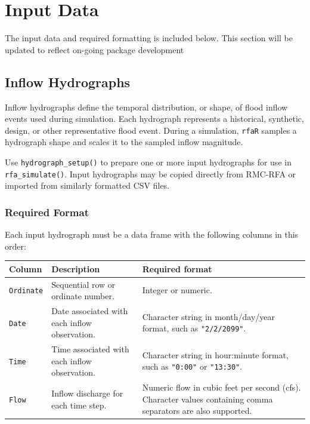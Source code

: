 \documentclass[
  letterpaper,
  DIV=11,
  numbers=noendperiod]{scrreprt}
\newcounter{none} %
\begin{document}
\section{Input Data}\label{input-data}

The input data and required formatting is included below. This section
will be updated to reflect on-going package development

\subsection{Inflow Hydrographs}\label{inflow-hydrographs}

Inflow hydrographs define the temporal distribution, or shape, of flood
inflow events used during simulation. Each hydrograph represents a
historical, synthetic, design, or other representative flood event.
During a simulation, \texttt{rfaR} samples a hydrograph shape and scales
it to the sampled inflow magnitude.

Use \texttt{hydrograph\_setup()} to prepare one or more input
hydrographs for use in \texttt{rfa\_simulate()}. Input hydrographs may
be copied directly from RMC-RFA or imported from similarly formatted CSV
files.

\subsubsection{Required Format}\label{required-format}

Each input hydrograph must be a data frame with the following columns in
this order:

{\def\LTcaptype{none} %
\begin{longtable}[]{@{}
  >{\raggedright\arraybackslash}p{}
  >{\raggedright\arraybackslash}p{}
  >{\raggedright\arraybackslash}p{}@{}}
\toprule\noalign{}
\begin{minipage}[b]{\linewidth}\raggedright
Column
\end{minipage} & \begin{minipage}[b]{\linewidth}\raggedright
Description
\end{minipage} & \begin{minipage}[b]{\linewidth}\raggedright
Required format
\end{minipage} \\
\midrule\noalign{}
\endhead
\bottomrule\noalign{}
\endlastfoot
\texttt{Ordinate} & Sequential row or ordinate number. & Integer or
numeric. \\
\texttt{Date} & Date associated with each inflow observation. &
Character string in month/day/year format, such as
\texttt{"2/2/2099"}. \\
\texttt{Time} & Time associated with each inflow observation. &
Character string in hour:minute format, such as \texttt{"0:00"} or
\texttt{"13:30"}. \\
\texttt{Flow} & Inflow discharge for each time step. & Numeric flow in
cubic feet per second (cfs). Character values containing comma
separators are also supported. \\
\end{longtable}
}
\end{document}

